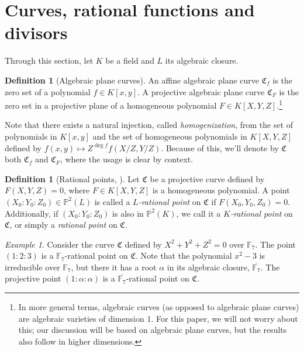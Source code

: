 \documentclass[11pt, oneside]{amsart}
\theoremstyle{definition}
\newtheorem{defn}[thm]{Definition}
\theoremstyle{remark}
\newtheorem*{exmp*}{Example}
\numberwithin{equation}{section}
\begin{document}
\section{Curves, rational functions and divisors}

Through this section, let $K$ be a field and $L$ its algebraic closure.

\begin{defn}[Algebraic plane curves]
	An affine algebraic plane curve $\mathfrak C_f$ is the zero set of a polynomial $f \in K[x, y]$.
	A projective algebraic plane curve $\mathfrak C_F$ is the zero set in a projective plane of a homogeneous polynomial $F \in K[X, Y, Z]$.\footnote{In more general terms, algebraic curves (as opposed to algebraic plane curves) are algebraic varieties of dimension $1$. For this paper, we will not worry about this; our discussion will be based on algebraic plane curves, but the results also follow in higher dimensions.}
\end{defn}


Note that there exists a natural injection, called \emph{homogenization}, from the set of polynomials in $K[x, y]$ and the set of homogeneous polynomials in $K[X, Y, Z]$ defined by $f(x, y) \mapsto Z^{\deg f}f(X/Z, Y/Z)$.
Because of this, we'll denote by $\mathfrak C$ both $\mathfrak C_f$ and $\mathfrak C_F$, where the usage is clear by context.

\begin{defn}[Rational points, \cite{Wal00}] %
	Let $\mathfrak C$ be a projective curve defined by $F(X, Y, Z) = 0$, where $F \in K[X, Y, Z]$ is a homogeneous polynomial.
	A point $(X_0 : Y_0 : Z_0) \in \mathbb{P}^2(L)$ is called a \emph{$L$-rational point} on $\mathfrak C$ if $F(X_0, Y_0, Z_0) = 0$.
	Additionally, if $(X_0 : Y_0 : Z_0)$ is also in $\mathbb{P}^2(K)$, we call it a \emph{$K$-rational point} on $\mathfrak C$, or simply a \emph{rational point} on $\mathfrak C$.
\end{defn}

\begin{exmp*}
	Consider the curve $\mathfrak C$ defined by $X^2 + Y^2 + Z^2 = 0$ over $\mathbb{F}_7$.
	The point $(1 : 2 : 3)$ is a $\mathbb{F}_7$-rational point on $\mathfrak C$.
	Note that the polynomial $x^2 - 3$ is irreducible over $\mathbb{F}_7$, but there it has a root $\alpha$ in its algebraic closure, $\overline{\mathbb{F}_7}$. The projective point $(1 :  \alpha : \alpha)$ is a $\overline{\mathbb{F}_7}$-rational point on $\mathfrak C$.
\end{exmp*}
\end{document}
